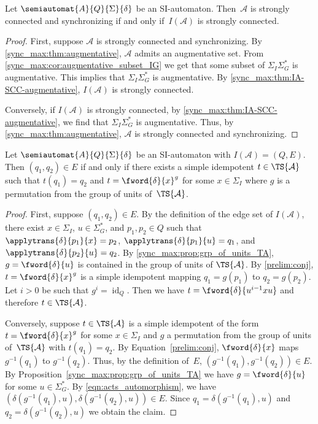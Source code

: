 \begin{theorem}
	\label{sync_max:thm:rystsov_SI}
	Let $\semiautomat{A}{Q}{\Sigma}{\delta}$ be an SI-automaton. 
	Then~$\mathcal A$ is strongly connected and synchronizing
	if and only if~$I(\mathcal A)$ is strongly connected.
\end{theorem}
\begin{proof}
	First, suppose $\mathcal A$ is strongly connected and synchronizing.
	By \cref{sync_max:thm:augmentative}, $\mathcal A$
	admits an augmentative set.
	From \cref{sync_max:cor:augmentative_subset_IG} 
	we get that some subset of $\Sigma_I\Sigma_G^*$
	is augmentative. This implies that $\Sigma_I \Sigma_G^*$ is augmentative.
	By \cref{sync_max:thm:IA-SCC-augmentative}, $I(\mathcal A)$ is strongly connected.
	
	Conversely,  if $I(\mathcal A)$ is strongly connected,
	by \cref{sync_max:thm:IA-SCC-augmentative}, 
	we find that $\Sigma_I\Sigma_G^*$ is augmentative.
	Thus, by \cref{sync_max:thm:augmentative}, $\mathcal A$
	is strongly connected and synchronizing. 
\end{proof}

\begin{theorem}  
	\label{sync_max:thm:rystsov-edges-simple-idemp-conj} 
	\label{sync_max:prop:SI}
	Let $\semiautomat{A}{Q}{\Sigma}{\delta}$ be an SI-automaton
	with $I(\mathcal A) = (Q, E)$.
	Then $(q_1,q_2) \in E$ if and only if there exists 
	a simple idempotent $t \in \TS{\mathcal A}$
	such that $t(q_1) = q_2$ and
	$t = \fword{\delta}{x}^g$	
	for some $x \in \Sigma_I$
	where $g$ is a permutation from the group of units of~$\TS{\mathcal A}$.	
\end{theorem}
\begin{proof}
	First, suppose $(q_1, q_2) \in E$.
	By the definition of the edge set of $I(\mathcal A)$,
	there exist $x \in \Sigma_I$,
	$u \in \Sigma_G^*$, and $p_1,p_2 \in Q$
	such that $\applytrans{\delta}{p_1}{x} = p_2$,
	$\applytrans{\delta}{p_1}{u} = q_1$,
	and $\applytrans{\delta}{p_2}{u} = q_2$.		
	By \cref{sync_max:prop:grp_of_units_TA},~$g = \fword{\delta}{u}$ is contained in the group of units of $\TS{\mathcal A}$.
	By \cref{prelim:conj}, $t = \fword{\delta}{x}^g$
	is a simple idempotent mapping $q_1 = g(p_1)$ to $q_2 = g(p_2)$.
	Let $i > 0$ be such that $g^i = \operatorname{id}_Q$.
	Then we have $t = \fword{\delta}{u^{i-1}x u}$
	and therefore $t \in \TS{\mathcal A}$.
	
	Conversely, suppose $t \in \TS{\mathcal A}$ is a simple idempotent of the form $t = \fword{\delta}{x}^g$
	for some $x \in \Sigma_I$
	and $g$ a permutation from the group of units of~$\TS{\mathcal A}$
	with $t(q_1) = q_2$.
	By Equation~\eqref{prelim:conj}, $\fword{\delta}{x}$
	maps $g^{-1}(q_1)$ to $g^{-1}(q_2)$.
	Thus, by the definition of~$E$,
	$(g^{-1}(q_1), g^{-1}(q_2)) \in E$.
	By Proposition~\ref{sync_max:prop:grp_of_units_TA}
	we have $g = \fword{\delta}{u}$ for some $u \in \Sigma_G^*$.
	By \cref{eqn:acts_automorphism},
	we have $(\delta(g^{-1}(q_1), u), \delta(g^{-1}(q_2), u)) \in E$.
	Since $q_1 = \delta(g^{-1}(q_1), u)$
	and $q_2 = \delta(g^{-1}(q_2), u)$
	we obtain the claim.
\end{proof}

